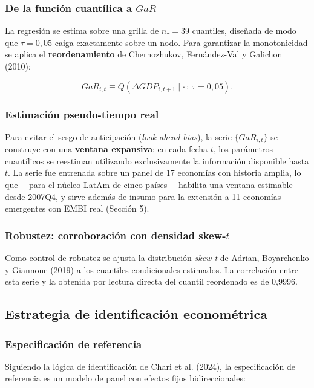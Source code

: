 \documentclass[5p,times,twocolumn,authoryear]{elsarticle}
\begin{document}
\subsubsection{De la función cuantílica a $GaR$}

La regresión se estima sobre una grilla de $n_\tau = 39$ cuantiles, diseñada de modo que $\tau = 0{,}05$ caiga exactamente sobre un nodo. Para garantizar la monotonicidad se aplica el \textbf{reordenamiento} de Chernozhukov, Fernández-Val y Galichon (2010):

\[ GaR_{i,t} \equiv Q\!\left(\Delta GDP_{i,t+1}\mid \cdot\,;\,\tau = 0{,}05\right). \]

\subsubsection{Estimación pseudo-tiempo real}

Para evitar el sesgo de anticipación (\textit{look-ahead bias}), la serie $\{GaR_{i,t}\}$ se construye con una \textbf{ventana expansiva}: en cada fecha $t$, los parámetros cuantílicos se reestiman utilizando exclusivamente la información disponible hasta $t$. La serie fue entrenada sobre un panel de 17 economías con historia amplia, lo que —para el núcleo LatAm de cinco países— habilita una ventana estimable desde 2007Q4, y sirve además de insumo para la extensión a 11 economías emergentes con EMBI real (Sección 5).

\subsubsection{Robustez: corroboración con densidad skew-$t$}

Como control de robustez se ajusta la distribución \textit{skew-t} de Adrian, Boyarchenko y Giannone (2019) a los cuantiles condicionales estimados. La correlación entre esta serie y la obtenida por lectura directa del cuantil reordenado es de 0,9996.

\subsection{Estrategia de identificación econométrica}

\subsubsection{Especificación de referencia}

Siguiendo la lógica de identificación de Chari et al. (2024), la especificación de referencia es un modelo de panel con efectos fijos bidireccionales:
\end{document}
